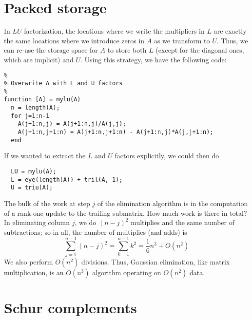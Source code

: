 \documentclass[12pt, leqno]{article} %
\begin{document}

\section{Packed storage}

In $LU$ factorization, the locations where we write the multipliers in
$L$ are exactly the same locations where we introduce zeros in $A$ as we
transform to $U$.  Thus, we can re-use the storage space for $A$ to
store both $L$ (except for the diagonal ones, which are implicit) and
$U$.  Using this strategy, we have the following code:
\begin{lstlisting}
%
% Overwrite A with L and U factors
%
function [A] = mylu(A)
  n = length(A);
  for j=1:n-1
    A(j+1:n,j) = A(j+1:n,j)/A(j,j);
    A(j+1:n,j+1:n) = A(j+1:n,j+1:n) - A(j+1:n,j)*A(j,j+1:n);
  end
\end{lstlisting}
If we wanted to extract the $L$ and $U$ factors explicitly, we could
then do
\begin{lstlisting}
  LU = mylu(A);
  L = eye(length(A)) + tril(A,-1);
  U = triu(A);
\end{lstlisting}

The bulk of the work at step $j$ of the elimination algorithm is in
the computation of a rank-one update to the trailing submatrix.
How much work is there in total?  In eliminating column $j$, we do
$(n-j)^2$ multiplies and the same number of subtractions; so in all,
the number of multiplies (and adds) is
\[
  \sum_{j=1}^{n-1} (n-j)^2 = \sum_{k=1}^{n-1} k^2 = \frac{1}{6} n^3 + O(n^2)
\]
We also perform $O(n^2)$ divisions.  Thus, Gaussian elimination, like
matrix multiplication, is an $O(n^3)$ algorithm operating on $O(n^2)$ data.

\section{Schur complements}
\end{document}
